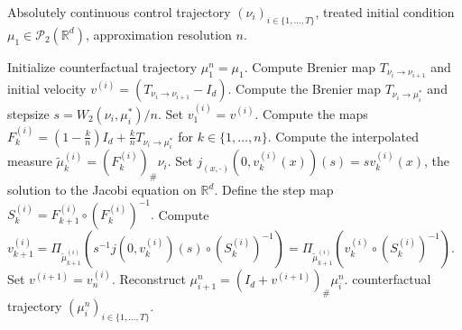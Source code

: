 \documentclass[11pt]{article}
\begin{document}
\begin{algorithm}[h]
    \begin{algorithmic}[1]
        \caption{Counterfactual trajectory reconstruction on $(\mathcal{P}_{2}(\mathbb{R}^d), W_2)$}
        \label{alg: W trajectory reconstruction}
        \Require Absolutely continuous control trajectory $(\nu_i)_{i \in \{1, \dots, T\}}$, treated initial condition $\mu_1 \in \mathcal{P}_2(\mathbb{R}^d)$, approximation resolution $n$. 
        
        \State Initialize counterfactual trajectory $\mu_1^n = \mu_1$. 
            \State Compute Brenier map $T_{\nu_i \rightarrow \nu_{i+1}}$ and initial velocity $v^{(i)} = (T_{\nu_i \rightarrow \nu_{i+1}} - I_d)$.
            \State Compute the Brenier map $T_{\nu_i \rightarrow \mu_i^*}$ and stepsize $s = W_2(\nu_i, \mu_i^*)/n.$
            \State Set $v^{(i)}_1 = v^{(i)}$.
            \State Compute the maps $F_k^{(i)} = (1 - \frac{k}{n})I_d + \frac{k}{n}T_{\nu_i \rightarrow \mu_i^*}$ for $k \in \{1, \dots, n\}$.
                \State Compute the interpolated measure $\tilde\mu_k^{(i)} = (F_{k}^{(i)})_\#\nu_i$.
                \State Set $j_{(x, \cdot)}(0, v_k^{(i)}(x))(s) = sv_k^{(i)}(x)$, the solution to the Jacobi equation on $\mathbb{R}^d$.
                \State Define the step map $S_k^{(i)} = F_{k+1}^{(i)} \circ (F_{k}^{(i)})^{-1}.$
                \State Compute $v_{k+1}^{(i)} = \Pi_{\tilde\mu_{k+1}^{(i)}}\left(s^{-1}j(0, v_k^{(i)})(s) \circ (S_k^{(i)})^{-1}\right) = \Pi_{\tilde\mu_{k + 1}^{(i)}}(v_k^{(i)} \circ (S_k^{(i)})^{-1})$. 
            \EndFor
            \State Set $v^{(i+1)} = v^{(i)}_n$.
            \State Reconstruct $\mu^n_{i+1} = (I_d + v^{(i+1)})_\#\mu_i^n$.
        \EndFor
    \State \Return counterfactual trajectory $(\mu_i^n)_{i \in \{1, \dots, T\}}$.
    \end{algorithmic}
\end{algorithm} 
\end{document}
